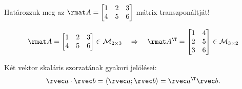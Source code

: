 \documentclass[a4paper, 12pt]{scrartcl}
\begin{document}
\begin{example}
  Határozzuk meg az $\rmat A = \begin{bmatrix}
      1 & 2 & 3 \\
      4 & 5 & 6
    \end{bmatrix}$ mátrix transzponáltját!

  $$
    \rmat A = \begin{bmatrix}
      1 & 2 & 3 \\
      4 & 5 & 6
    \end{bmatrix} \in \mathcal M_{2 \times 3}
    \quad \Rightarrow \quad
    \rmat A^\T = \begin{bmatrix}
      1 & 4 \\
      2 & 5 \\
      3 & 6
    \end{bmatrix} \in \mathcal M_{3 \times 2}
  $$
\end{example}

\begin{note}
  Két vektor skaláris szorzatának gyakori jelölései:
  $$
    \rvec a \cdot \rvec b
    = \langle \rvec a; \rvec b \rangle
    = \rvec a^\T \rvec b
    \text.
  $$
\end{note}
\end{document}
